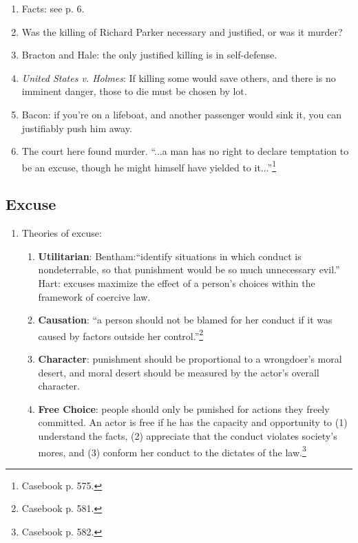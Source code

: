 \begin{enumerate}
    \item Facts: see p. 6.
    \item Was the killing of Richard Parker necessary and justified, or was it 
    murder?
    \item Bracton and Hale: the only justified killing is in self-defense.
    \item \emph{United States v. Holmes}: If killing some would save others, 
    and there is no imminent danger, those to die must be chosen by lot.
    \item Bacon: if you're on a lifeboat, and another passenger would sink it, 
    you can justifiably push him away.
    \item The court here found murder. ``...a man has no right to declare 
    temptation to be an excuse, though he might himself have yielded to 
    it...''\footnote{Casebook p. 575.}
\end{enumerate}

\subsection{Excuse}

\begin{enumerate}
    \item Theories of excuse:
    \begin{enumerate}
        \item \textbf{Utilitarian}: Bentham:``identify situations in which 
        conduct is nondeterrable, so that punishment would be so much 
        unnecessary evil.'' Hart: excuses maximize the effect of a person's 
        choices within the framework of coercive law.
        \item \textbf{Causation}: ``a person should not be blamed for her 
        conduct if it was caused by factors outside her 
        control.''\footnote{Casebook p. 581.}
        \item \textbf{Character}: punishment should be proportional to a 
        wrongdoer's moral desert, and moral desert should be measured by the 
        actor's overall character.
        \item \textbf{Free Choice}: people should only be punished for actions 
        they freely committed. An actor is free if he has the capacity and 
        opportunity to (1) understand the facts, (2) appreciate that the 
        conduct violates society's mores, and (3) conform her conduct to the 
        dictates of the law.\footnote{Casebook p. 582.}
    \end{enumerate}
\end{enumerate}

